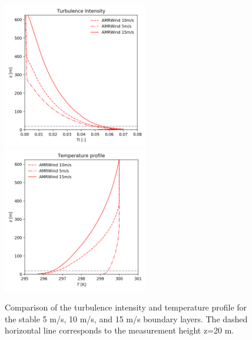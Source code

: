 \begin{figure}[hbt!]
  \centering
  \includegraphics[width=2.5in]{figures/AMRWind_allWS/AMRWind_stable_TI.png}
  \includegraphics[width=2.5in]{figures/AMRWind_allWS/AMRWind_stable_T.png}
  \caption{ \label{fig:CompareAMRallTTI} Comparison of the turbulence
    intensity and temperature profile for the stable 5 m/s, 10 m/s,
    and 15 m/s boundary layers. The dashed horizontal line corresponds
    to the measurement height z=20 m.}
\end{figure}



